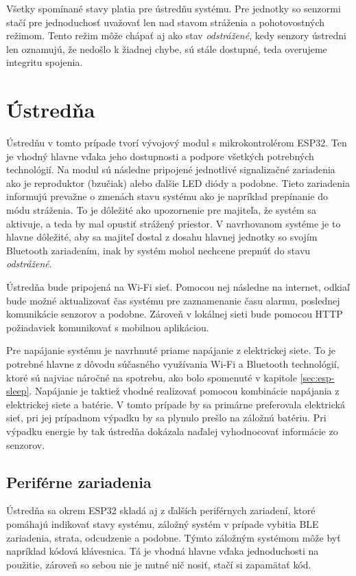 Všetky spomínané stavy platia pre ústredňu systému. Pre jednotky so senzormi stačí pre jednoduchosť uvažovať len nad stavom stráženia a pohotovostných režimom. Tento režim môže chápať aj ako stav \textit{odstrážené}, kedy senzory ústredni len oznamujú, že nedošlo k žiadnej chybe, sú stále dostupné, teda overujeme integritu spojenia.

\section{Ústredňa}

Ústredňu v tomto prípade tvorí vývojový modul s mikrokontrolérom ESP32. Ten je vhodný hlavne vďaka jeho dostupnosti a podpore všetkých potrebných technológií. Na modul sú následne pripojené jednotlivé signalizačné zariadenia ako je reproduktor (bzučiak) alebo ďalšie LED diódy a podobne. Tieto zariadenia informujú prevažne o zmenách stavu systému ako je napríklad prepínanie do módu stráženia. To je dôležité ako upozornenie pre majiteľa, že systém sa aktivuje, a teda by mal opustiť strážený priestor. V navrhovanom systéme je to hlavne dôležité, aby sa majiteľ dostal z dosahu hlavnej jednotky so svojím Bluetooth zariadením, inak by systém mohol nechcene prepnúť do stavu \textit{odstrážené}.

Ústredňa bude pripojená na Wi-Fi sieť. Pomocou nej následne na internet, odkiaľ bude možné aktualizovať čas systému pre zaznamenanie času alarmu, poslednej komunikácie senzorov a podobne. Zároveň v lokálnej sieti bude pomocou HTTP požiadaviek komunikovať s mobilnou aplikáciou.

Pre napájanie systému je navrhnuté priame napájanie z elektrickej siete. To je potrebné hlavne z dôvodu súčasného využívania Wi-Fi a Bluetooth technológií, ktoré sú najviac náročné na spotrebu, ako bolo spomenuté v kapitole \ref{sec:esp-sleep}. Napájanie je taktiež vhodné realizovať pomocou kombinácie napájania z elektrickej siete a batérie. V tomto prípade by sa primárne preferovala elektrická sieť, pri jej prípadnom výpadku by sa plynulo prešlo na záložnú batériu. Pri výpadku energie by tak ústredňa dokázala naďalej vyhodnocovať informácie zo senzorov.

\subsection{Periférne zariadenia}

Ústredňa sa okrem ESP32 skladá aj z ďalších periférnych zariadení, ktoré pomáhajú indikovať stavy systému, záložný systém v prípade vybitia BLE zariadenia, strata, odcudzenie a podobne. Týmto záložným systémom môže byť napríklad kódová klávesnica. Tá je vhodná hlavne vďaka jednoduchosti na použitie, zároveň so sebou nie je nutné nič nosiť, stačí si zapamätať kód.

